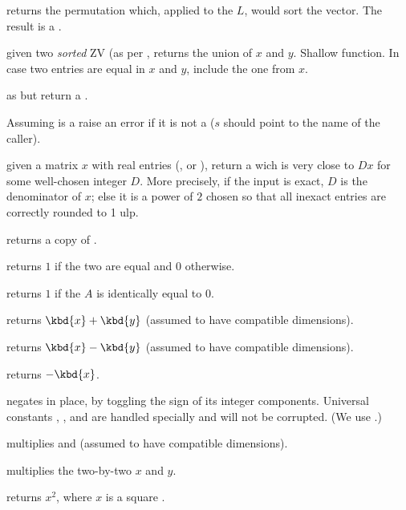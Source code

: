  returns the permutation which, applied to the
 $L$, would sort the vector. The result is a .

 given two \emph{sorted} ZV (as per
, returns the union of $x$ and $y$. Shallow function. In case two
entries are equal in $x$ and $y$,  include the one from $x$.

 as  but return
a .


 Assuming  is a 
raise an error if it is not a  ($s$ should point to the name of the
caller).

 given a matrix $x$ with real entries
(,  or ), return a  wich is very close
to $D x$ for some well-chosen integer $D$. More precisely, if the input is
exact, $D$ is the denominator of $x$; else it is a power of $2$ chosen
so that all inexact entries are correctly rounded to 1 ulp.

 returns a copy of .

 returns $1$ if the two  are equal
and $0$ otherwise.

 returns $1$ if the  $A$ is identically
equal to $0$.

 returns $\kbd{x} + \kbd{y}$ (assumed to have
compatible dimensions).

 returns $\kbd{x} - \kbd{y}$ (assumed to have
compatible dimensions).

 returns $-\kbd{x}$.

 negates  in place, by toggling the
sign of its integer components. Universal constants ,
,  and  are handled specially and will
not be corrupted. (We use .)

 multiplies  and  (assumed to
have compatible dimensions).

 multiplies the two-by-two  $x$ and $y$.

 returns $x^2$, where $x$ is a square .

